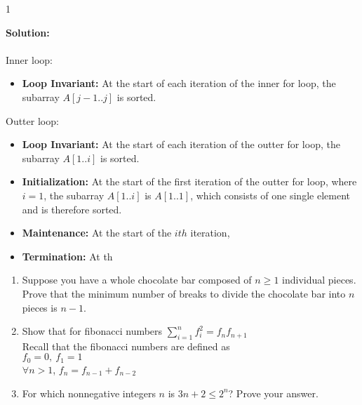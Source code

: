 \documentclass[9pt]{article}
\def\solutions{1}
\begin{document}
\if\solutions1
\vspace{2mm}

\textbf{Solution:} \\ \\ 
Inner loop:
\begin{itemize}
    \item \textbf{Loop Invariant:} At the start of each iteration of the inner for loop, the subarray $A[j-1 .. j]$ is sorted.
\end{itemize}

Outter loop:
\begin{itemize}
    \item \textbf{Loop Invariant:} At the start of each iteration of the outter for loop, the subarray $A[1..i]$ is sorted.
    \item \textbf{Initialization:} At the start of the first iteration of the outter for loop, where $i=1$, the subarray $A[1..i]$ is $A[1..1]$, which consists of one single element and is therefore sorted.
    \item \textbf{Maintenance:} At the start of the $ith$ iteration, 
    \item \textbf{Termination:} At th
\end{itemize}

\fi

\newpage




\vspace{5mm}

\item



\begin{enumerate}

\item Suppose you have a whole chocolate bar composed of $n\geq 1$ individual pieces.  Prove that the minimum number of breaks to divide the chocolate bar into $n$ pieces is $n-1$. 

\item{
Show that for fibonacci numbers $\sum_{i=1}^n f_i^2 = f_{n}f_{n+1}$\\
 Recall that the fibonacci numbers are defined as \\
 $f_0 = 0,\ f_1=1$ \\
 $\forall n>1$, $f_n=f_{n-1} + f_{n-2}$}
 
\item For which nonnegative integers $n$ is $3n+2 \leq 2^n$? Prove your answer.

\end{enumerate}
\end{document}
